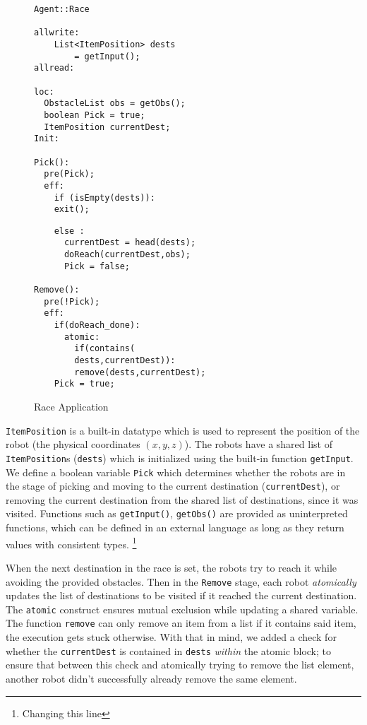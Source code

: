 \begin{figure}[ht!]
\label{fig:Race}
\noindent\begin{minipage}{.5\textwidth}

\begin{lstlisting}
Agent::Race

allwrite:
	List<ItemPosition> dests 
    	= getInput();
allread:

loc:
  ObstacleList obs = getObs();
  boolean Pick = true; 
  ItemPosition currentDest;
Init:

Pick():
  pre(Pick);
  eff:
    if (isEmpty(dests)):
    exit();   
 \end{lstlisting}
 \end{minipage}\hfill
\noindent\begin{minipage}{.5\textwidth}

\begin{lstlisting}
    else :
      currentDest = head(dests);
      doReach(currentDest,obs);
      Pick = false;
      
Remove():
  pre(!Pick);
  eff:
    if(doReach_done):
      atomic:
        if(contains(
        dests,currentDest)):
        remove(dests,currentDest);
    Pick = true;
 \end{lstlisting}
 \end{minipage}\hfill
 \caption{Race Application}
 \end{figure}
\verb|ItemPosition| is a built-in datatype which is used to represent the position of the robot (the physical coordinates $(x,y,z)$). The robots have a shared list of \verb|ItemPosition|s (\verb|dests|) which is initialized using the built-in function \verb|getInput|. We define a boolean variable \verb|Pick| which determines whether the robots are in the stage of picking and moving to the current destination (\verb|currentDest|), or removing the current destination from the shared list of destinations, since it was visited. Functions such as \verb|getInput()|, \verb|getObs()| are provided as uninterpreted functions, which can be defined in an external language as long as they return values with consistent types. \footnote{Changing this line}

 When the next destination in the race is set, the robots try to reach it while avoiding the provided obstacles. Then in the \verb|Remove| stage, each robot \emph{atomically} updates the list of destinations to be visited if it reached the current destination. The \verb|atomic| construct ensures mutual exclusion while updating a shared variable. The function \verb|remove| can only remove an item from a list if it contains said item, the execution gets stuck otherwise. With that in mind, we added a check for whether the \verb|currentDest| is contained in \verb|dests| \emph{within} the atomic block; to ensure that between this check and atomically trying to remove the list element, another robot didn't successfully already remove the same element. 
